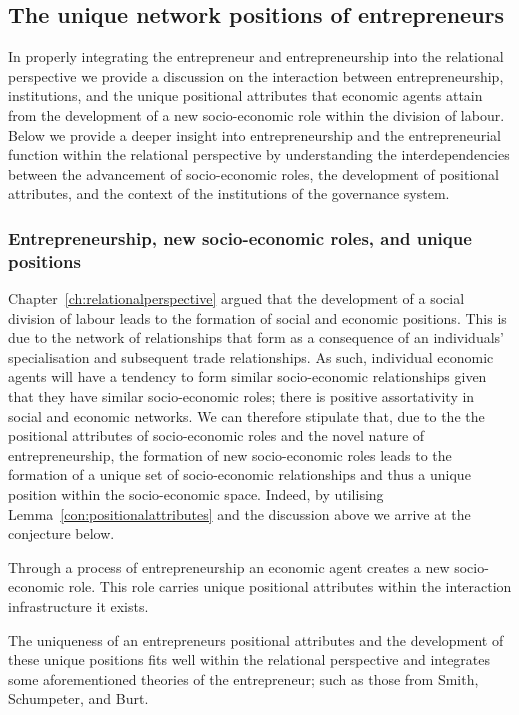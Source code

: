 \subsection{The unique network positions of entrepreneurs}

In properly integrating the entrepreneur and entrepreneurship into the relational perspective we provide a discussion on the interaction between entrepreneurship, institutions, and the unique positional attributes that economic agents attain from the development of a new socio-economic role within the division of labour. Below we provide a deeper insight into entrepreneurship and the entrepreneurial function within the relational perspective by understanding the interdependencies between the advancement of socio-economic roles, the development of positional attributes, and the context of the institutions of the governance system.

\subsubsection{Entrepreneurship, new socio-economic roles, and unique positions}

Chapter~\ref{ch:relationalperspective} argued that the development of a social division of labour leads to the formation of social and economic positions. This is due to the network of relationships that form as a consequence of an individuals' specialisation and subsequent trade relationships. As such, individual economic agents will have a tendency to form similar socio-economic relationships given that they have similar socio-economic roles; there is positive assortativity in social and economic networks. We can therefore stipulate that, due to the the positional attributes of socio-economic roles and the novel nature of entrepreneurship, the formation of new socio-economic roles leads to the formation of a unique set of socio-economic relationships and thus a unique position within the socio-economic space. Indeed, by utilising Lemma~\ref{con:positionalattributes} and the discussion above we arrive at the conjecture below. 
\begin{conjecture} \label{conjecture:UniquePositions}
Through a process of entrepreneurship an economic agent creates a new socio-economic role. This role carries unique positional attributes within the interaction infrastructure it exists.
\end{conjecture}
The uniqueness of an entrepreneurs positional attributes and the development of these unique positions fits well within the relational perspective and integrates some aforementioned theories of the entrepreneur; such as those from Smith, Schumpeter, and Burt.

